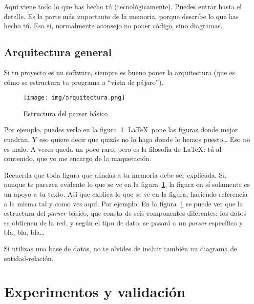 \documentclass[a4paper, 12pt]{book}
\begin{document}
	Aquí viene todo lo que has hecho tú (tecnológicamente). 
	Puedes entrar hasta el detalle. 
	Es la parte más importante de la memoria, porque describe lo que has hecho tú.
	Eso sí, normalmente aconsejo no poner código, sino diagramas.
	
	
	
	\section{Arquitectura general} 
	\label{sec:arquitectura}
	
	Si tu proyecto es un software, siempre es bueno poner la arquitectura (que es cómo se estructura tu programa a ``vista de pájaro'').
	
	\begin{figure}
		\centering
		\texttt{[image: img/arquitectura.png]}
		\caption{Estructura del parser básico}
		\label{fig:arquitectura}
	\end{figure}
	
	
	Por ejemplo, puedes verlo en la figura~\ref{fig:arquitectura}.
	\LaTeX \ pone las figuras donde mejor cuadran. 
	Y eso quiere decir que quizás no lo haga donde lo hemos puesto\ldots 
	Eso no es malo.
	A veces queda un poco raro, pero es la filosofía de \LaTeX: tú al contenido, que yo me encargo de la maquetación.
	
	
	
	Recuerda que toda figura que añadas a tu memoria debe ser explicada.
	Sí, aunque te parezca evidente lo que se ve en la figura~\ref{fig:arquitectura}, la figura en sí solamente es un apoyo a tu texto.
	Así que explica lo que se ve en la figura, haciendo referencia a la misma tal y como ves aquí.
	Por ejemplo: En la figura~\ref{fig:arquitectura} se puede ver que la estructura del \emph{parser} básico, que consta de seis componentes diferentes: los datos se obtienen de la red, y según el tipo de dato, se pasará a un \emph{parser} específico y bla, bla, bla\ldots
	
	Si utilizas una base de datos, no te olvides de incluir también un diagrama de entidad-relación.
	
	
	
	\cleardoublepage
	\chapter{Experimentos y validación}
	\label{chap:experimentos}
	
\end{document}
